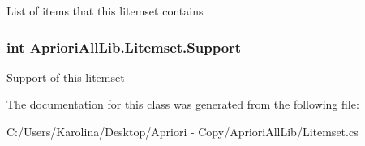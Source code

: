 List of items that this litemset contains 

\hypertarget{class_apriori_all_lib_1_1_litemset_a9f37ba3b3423bc7a1619493132dbc3e2}{
\subsubsection[{Support}]{\setlength{\rightskip}{0pt plus 5cm}int Apriori\-All\-Lib.\-Litemset.\-Support}}\label{class_apriori_all_lib_1_1_litemset_a9f37ba3b3423bc7a1619493132dbc3e2}


Support of this litemset 



The documentation for this class was generated from the following file\-:\begin{DoxyCompactItemize}
\item 
C\-:/\-Users/\-Karolina/\-Desktop/\-Apriori -\/ Copy/\-Apriori\-All\-Lib/Litemset.\-cs\end{DoxyCompactItemize}
